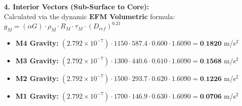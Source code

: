 \documentclass[11pt, a4paper]{article}
\begin{document}
  \vspace{0.5em}
  \noindent \textbf{4. Interior Vectors (Sub-Surface to Core):} \\[0.5em]
  \hspace*{1em} Calculated via the dynamic \textbf{EFM Volumetric} formula: $g_M = (\alpha G) \cdot \rho_{M} \cdot R_M \cdot \tau_M \cdot (D_{ref})^{0.21}$
  \begin{itemize}
    \item \textbf{M4 Gravity:} $(2.792 \times 10^{-7}) \cdot 1150 \cdot 587.4 \cdot 0.600 \cdot 1.6090 = \textbf{0.1820}$ m/s$^2$
    \item \textbf{M3 Gravity:} $(2.792 \times 10^{-7}) \cdot 1300 \cdot 440.6 \cdot 0.610 \cdot 1.6090 = \textbf{0.1568}$ m/s$^2$
    \item \textbf{M2 Gravity:} $(2.792 \times 10^{-7}) \cdot 1500 \cdot 293.7 \cdot 0.620 \cdot 1.6090 = \textbf{0.1226}$ m/s$^2$
    \item \textbf{M1 Gravity:} $(2.792 \times 10^{-7}) \cdot 1700 \cdot 146.9 \cdot 0.630 \cdot 1.6090 = \textbf{0.0706}$ m/s$^2$
  \end{itemize}
\end{document}

